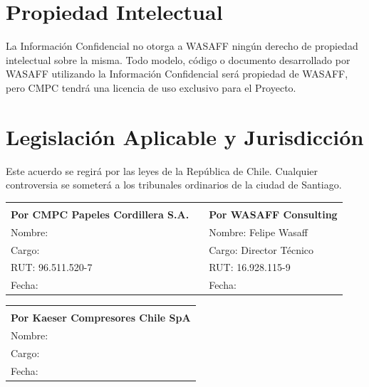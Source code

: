 \documentclass[11pt,a4paper]{article}
\begin{document}
\section*{Propiedad Intelectual}

La Información Confidencial no otorga a WASAFF ningún derecho de propiedad intelectual sobre la misma. Todo modelo, código o documento desarrollado por WASAFF utilizando la Información Confidencial será propiedad de WASAFF, pero CMPC tendrá una licencia de uso exclusivo para el Proyecto.

\section*{Legislación Aplicable y Jurisdicción}

Este acuerdo se regirá por las leyes de la República de Chile. Cualquier controversia se someterá a los tribunales ordinarios de la ciudad de Santiago.

\vspace{2cm}

\begin{center}
\begin{tabular}{p{6cm}p{1cm}p{6cm}}
\hrulefill & & \hrulefill \\
\textbf{Por CMPC Papeles Cordillera S.A.} & & \textbf{Por WASAFF Consulting} \\
Nombre: & & Nombre: Felipe Wasaff \\
Cargo: & & Cargo: Director Técnico \\
RUT: 96.511.520-7 & & RUT: 16.928.115-9 \\
Fecha: & & Fecha: \\
\end{tabular}
\end{center}

\vspace{1cm}

\begin{center}
\begin{tabular}{p{6cm}}
\hrulefill \\
\textbf{Por Kaeser Compresores Chile SpA} \\
Nombre: \\
Cargo: \\
Fecha: \\
\end{tabular}
\end{center}
\end{document}
